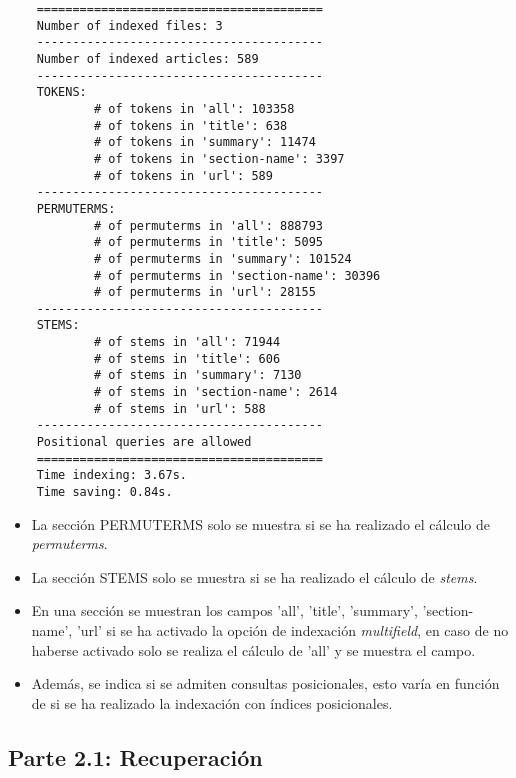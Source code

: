 \documentclass[12pt,a4paper]{article}
\begin{document}
\begin{verbatim}
    ========================================
    Number of indexed files: 3
    ----------------------------------------
    Number of indexed articles: 589
    ----------------------------------------
    TOKENS:
            # of tokens in 'all': 103358
            # of tokens in 'title': 638
            # of tokens in 'summary': 11474
            # of tokens in 'section-name': 3397
            # of tokens in 'url': 589
    ----------------------------------------
    PERMUTERMS:
            # of permuterms in 'all': 888793
            # of permuterms in 'title': 5095
            # of permuterms in 'summary': 101524
            # of permuterms in 'section-name': 30396
            # of permuterms in 'url': 28155
    ----------------------------------------
    STEMS:
            # of stems in 'all': 71944
            # of stems in 'title': 606
            # of stems in 'summary': 7130
            # of stems in 'section-name': 2614
            # of stems in 'url': 588
    ----------------------------------------
    Positional queries are allowed
    ========================================
    Time indexing: 3.67s.
    Time saving: 0.84s.
\end{verbatim}

\begin{itemize}
  \item La sección PERMUTERMS solo se muestra si se ha realizado el cálculo de \textit{permuterms}.
  \item La sección STEMS solo se muestra si se ha realizado el cálculo de \textit{stems}.
  \item En una sección se muestran los campos 'all', 'title', 'summary', 'section-name', 'url' si se ha activado la opción de indexación \textit{multifield}, en caso de no haberse activado solo se realiza el cálculo de 'all' y se muestra el campo.
  \item Además, se indica si se admiten consultas posicionales, esto varía en función de si se ha realizado la indexación con índices posicionales.
\end{itemize}

\subsection{Parte 2.1: Recuperación}
\end{document}
